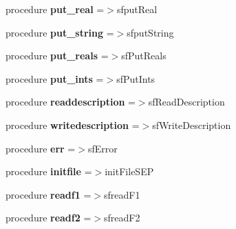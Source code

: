 \begin{DoxyCompactItemize}
procedure {\bfseries put\+\_\+real} =$>$sfput\+Real
\item 
\mbox{\label{structsep__regfile__mod_1_1sepfile_aabaa4a1e1d60b28449ff81944faa4e9b}} 
procedure {\bfseries put\+\_\+string} =$>$sfput\+String
\item 
\mbox{\label{structsep__regfile__mod_1_1sepfile_a783e715169f55de0228942bd90027ff1}} 
procedure {\bfseries put\+\_\+reals} =$>$sf\+Put\+Reals
\item 
\mbox{\label{structsep__regfile__mod_1_1sepfile_a90e5021a37a71ef686926113727dcc02}} 
procedure {\bfseries put\+\_\+ints} =$>$sf\+Put\+Ints
\item 
\mbox{\label{structsep__regfile__mod_1_1sepfile_a336a620f50f6962052d949163f5fc627}} 
procedure {\bfseries readdescription} =$>$sf\+Read\+Description
\item 
\mbox{\label{structsep__regfile__mod_1_1sepfile_af42de630e3426661500d859f3051296a}} 
procedure {\bfseries writedescription} =$>$sf\+Write\+Description
\item 
\mbox{\label{structsep__regfile__mod_1_1sepfile_aa9e2ac40de9299a084060a278de7156e}} 
procedure {\bfseries err} =$>$sf\+Error
\item 
\mbox{\label{structsep__regfile__mod_1_1sepfile_ac1a9c35ca507ad38d99bd4a9243a7463}} 
procedure {\bfseries initfile} =$>$init\+File\+S\+EP
\item 
\mbox{\label{structsep__regfile__mod_1_1sepfile_ab7e1e12378bc9e6e0fac76db525510eb}} 
procedure {\bfseries readf1} =$>$sfread\+F1
\item 
\mbox{\label{structsep__regfile__mod_1_1sepfile_a10a57e56a0131eeda9340ea1e7c461b3}} 
procedure {\bfseries readf2} =$>$sfread\+F2
\item 
\mbox{\label{structsep__regfile__mod_1_1sepfile_ab24856bd3a208f5ffc6a688d9022032e}} 

\end{DoxyCompactItemize}
